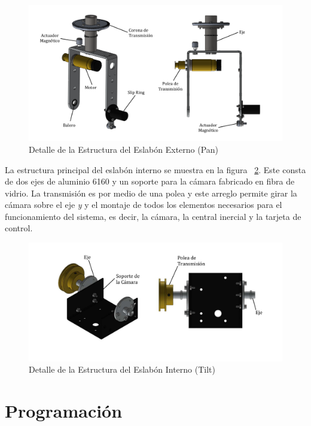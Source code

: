 \begin{figure}[H]
\centering \includegraphics[scale=0.53,trim = 30mm 5mm 30mm 10mm]{img/BasePan.pdf}
\caption{Detalle de la Estructura del Eslab\'{o}n Externo (Pan)}
\label{fig:Pan}
\end{figure}

La estructura principal del eslab\'{o}n interno se muestra en la figura ~\ref{fig:Tilt}. Este consta de dos ejes de aluminio 6160 y un soporte para la c\'{a}mara fabricado en fibra de vidrio. La transmisi\'{o}n es por medio de una polea y este arreglo permite girar la c\'{a}mara sobre el eje \textit{y} y el montaje de todos los elementos necesarios para el funcionamiento del sistema, es decir, la c\'{a}mara, la central inercial y la tarjeta de control. 


\begin{figure}[H]
\centering \includegraphics[scale=0.47,trim = 30mm 25mm 20mm 5mm]{img/BaseTilt.pdf}
\caption{Detalle de la Estructura del Eslab\'{o}n Interno (Tilt)}
\label{fig:Tilt}
\end{figure} 


\section{Programaci\'{o}n}\label{sec:Programacion}

